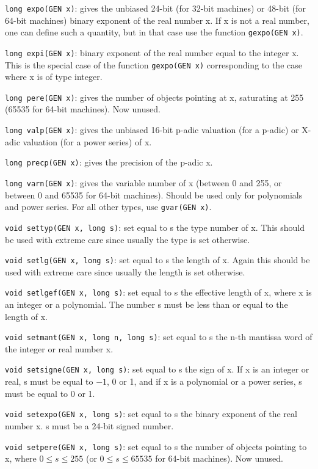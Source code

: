 {\tt long expo(GEN x)}: gives the unbiased 24-bit (for 32-bit machines)
or 48-bit (for 64-bit machines) binary exponent of the real
number x. If x is not a real number, one can define such a quantity, but in
that case use the function {\tt gexpo(GEN x)}.

{\tt long expi(GEN x)}: binary exponent of the real number equal to the integer
x. This is the special case of the function {\tt gexpo(GEN x)} corresponding
to the case where x is of type integer.

{\tt long pere(GEN x)}: gives the number of objects pointing at x, saturating
at 255 (65535 for 64-bit machines). Now unused.

{\tt long valp(GEN x)}: gives the unbiased 16-bit p-adic valuation (for a
p-adic) or X-adic valuation (for a power series) of x.

{\tt long precp(GEN x)}: gives the precision of the p-adic x.

{\tt long varn(GEN x)}: gives the variable number of x (between 0 and 255,
or between 0 and 65535 for 64-bit machines).
Should be used only for polynomials and power series. For all other types,
use {\tt gvar(GEN x)}.

{\tt void settyp(GEN x, long s)}: set equal to s the type number of x. This
should be used with extreme care since usually the type is set otherwise.

{\tt void setlg(GEN x, long s)}: set equal to s the length of x. Again this
should be used with extreme care since usually the length is set otherwise.

{\tt void setlgef(GEN x, long s)}: set equal to s the effective length of x,
where x is an integer or a polynomial. The number s must be less than or equal
to the length of x.

{\tt void setmant(GEN x, long n, long s)}: set equal to s the n-th mantissa
word of the integer or real number x.

{\tt void setsigne(GEN x, long s)}: set equal to s the sign of x. If x is an
integer or real, s must be equal to $-1$, 0 or 1, and if x is a polynomial or
a power series, s must be equal to 0 or 1.

{\tt void setexpo(GEN x, long s)}: set equal to s the binary exponent of
the real number x. s must be a 24-bit signed number.

{\tt void setpere(GEN x, long s)}: set equal to s the number of objects 
pointing to x, where $0\le s\le255$ (or $0\le s\le 65535$ for 64-bit
machines). Now unused.

